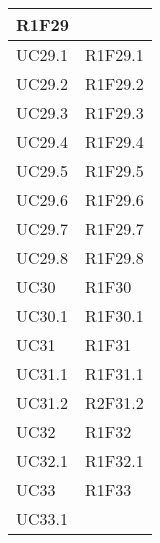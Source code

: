 \begin{center}
\begin{longtable}{|p{44mm}|p{22mm}|}
R1F29 \newline
\\
\hline
UC29.1 &

R1F29.1 \newline
\\
\hline
UC29.2 &

R1F29.2 \newline
\\
\hline
UC29.3 &

R1F29.3 \newline
\\
\hline
UC29.4 &

R1F29.4 \newline
\\
\hline
UC29.5 &

R1F29.5 \newline
\\
\hline
UC29.6 &

R1F29.6 \newline
\\
\hline
UC29.7 &

R1F29.7 \newline
\\
\hline
UC29.8 &

R1F29.8 \newline
\\
\hline
UC30 &

R1F30 \newline
\\
\hline
UC30.1 &

R1F30.1 \newline
\\
\hline
UC31 &

R1F31 \newline
\\
\hline
UC31.1 &

R1F31.1 \newline
\\
\hline
UC31.2 &

R2F31.2 \newline
\\
\hline
UC32 &

R1F32 \newline
\\
\hline
UC32.1 &

R1F32.1 \newline
\\
\hline
UC33 &

R1F33 \newline
\\
\hline
UC33.1 &


\end{longtable}
\end{center}
